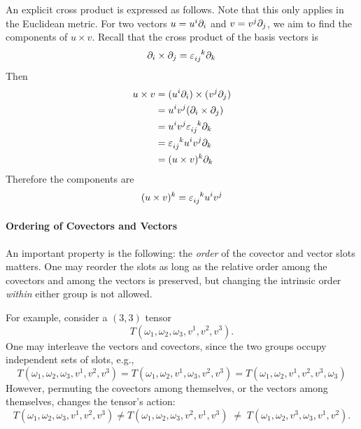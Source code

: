 		\begin{remark}
			An explicit cross product is expressed as follows. Note that this
			only applies in the Euclidean metric. For two vectors
			$u = u^i \partial_i$ and $v = v^j \partial_j$, we aim to find the components
			of $u \times v$. Recall that the cross product of the basis
			vectors is
			\[
				\p_i \times \p_j = \tensor{\varepsilon}{_{ij}^k} \p_k
			\]
			Then
			\begin{align*}
				u \times v
				&= (u^i \p_i) \times (v^j \p_j) \\
				&= u^i v^j (\p_i \times \p_j) \\
				&= u^i v^j \tensor{\varepsilon}{_{ij}^k} \p_k \\
				&= \tensor{\varepsilon}{_{ij}^k} u^i v^j \p_k \\
				&= (u \times v)^k \p_k
			\end{align*}
			Therefore the components are
			\[
				(u \times v)^k = \tensor{\varepsilon}{_{ij}^k} u^i v^j
			\]
		\end{remark}

		\paragraph{Ordering of Covectors and Vectors}
		An important property is the following: the \emph{order} of the covector
		and vector slots matters. One may reorder the slots as long as the
		relative order among the covectors and among the vectors is preserved,
		but changing the intrinsic order \emph{within} either group is not allowed.

		For example, consider a $(3,3)$ tensor
		\[
			T(\omega_1, \omega_2, \omega_3, v^1, v^2, v^3).
		\]
		One may interleave the vectors and covectors, since the two groups
		occupy independent sets of slots, e.g.,
		\[
			T(\omega_1, \omega_2, \omega_3, v^1, v^2, v^3)
			=
			T(\omega_1, \omega_2, v^1, \omega_3, v^2, v^3)
			=
			T(\omega_1, \omega_2, v^1,v^2,v^3, \omega_3)
		\]
		However, permuting the covectors among themselves, or the vectors among
		themselves, changes the tensor's action:
		\[
			T(\omega_1, \omega_2, \omega_3, v^1, v^2, v^3)
			\neq
			T(\omega_1, \omega_2, \omega_3, v^2, v^1, v^3)
			\;\neq\;
			T(\omega_1, \omega_2, v^3, \omega_3, v^1, v^2).
		\]

	

	




